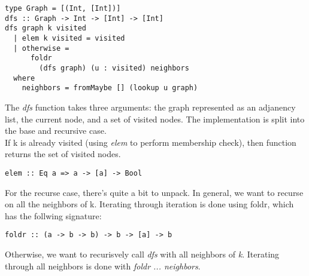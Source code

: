 
\begin{verbatim}
type Graph = [(Int, [Int])]
dfs :: Graph -> Int -> [Int] -> [Int]
dfs graph k visited
  | elem k visited = visited
  | otherwise =
      foldr
        (dfs graph) (u : visited) neighbors
  where
    neighbors = fromMaybe [] (lookup u graph)
\end{verbatim}

The \textit{dfs} function takes three arguments: the graph represented as an
adjanency list, the current node, and a set of visited nodes. The implementation
is split into the base and recursive case.\\

If k is already visited (using \textit{elem} to perform membership check), then
function returns the set of visited nodes.

\begin{verbatim}
elem :: Eq a => a -> [a] -> Bool
\end{verbatim}

For the recurse case, there's quite a bit to unpack. In general, we want to
recurse on all the neighbors of k. Iterating through iteration is done using foldr, which has
the follwing signature: 

\begin{verbatim}
foldr :: (a -> b -> b) -> b -> [a] -> b
\end{verbatim}

Otherwise, we want to recurisvely call \textit{dfs} with all neighbors of
\textit{k}. Iterating through all neighbors is done with \textit{foldr ...
neighbors}.